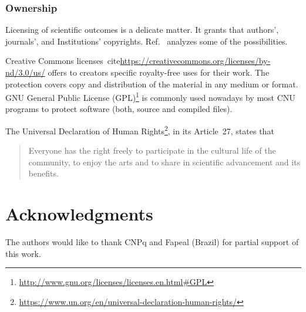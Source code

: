 \documentclass[journal,twoside]{IEEEtran}
\begin{document}
\subsubsection{Ownership}\label{Sec:Ownership}

Licensing of scientific outcomes  is a delicate matter.
It grants that authors', journals', and Institutions' copyrights.
Ref.~\cite{TheLegalFrameworkforReproducibleScientificResearchLicensingandCopyright} analyzes some of the possibilities.  

Creative Commons licenses~cite{\url{https://creativecommons.org/licenses/by-nd/3.0/us/}} offers to creators specific royalty-free uses for their work. The protection covers copy and distribution of the material in any medium or format. GNU General Public License (GPL)\footnote{\url{http://www.gnu.org/licenses/licenses.en.html#GPL}} is commonly used nowadays by most CNU programs to protect software (both, source and compiled files). 

The Universal Declaration of Human Rights\footnote{\url{https://www.un.org/en/universal-declaration-human-rights/}}, in its Article~27, states that
\begin{quotation}
	Everyone has the right freely to participate in the cultural life of the community, to enjoy the arts and to share in scientific advancement and its benefits.
\end{quotation}




	
\section*{Acknowledgments}

The authors would like to thank CNPq and Fapeal (Brazil) for partial support of this work.
	
	



	
\end{document}
